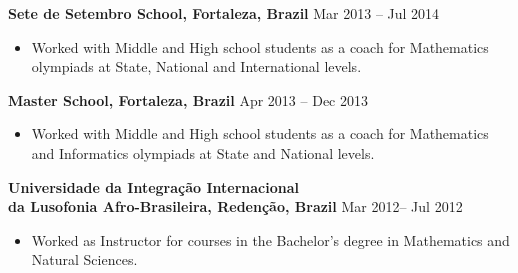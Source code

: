 \documentclass[10pt]{article}
\renewcommand{\section}[1]{\pagebreak[3]%
    \hyphenpenalty=10000%
    \vspace{1.3\baselineskip}%
    \phantomsection\addcontentsline{toc}{section}{#1}%
    \noindent\llap{\scshape\smash{\parbox[t]{\marginparwidth}{\raggedright #1}}}%
    \vspace{-\baselineskip}\par}
\newenvironment{innerlist}[1][\enskip\textbullet]%
        {\begin{itemize}[#1,leftmargin=*,parsep=0pt,itemsep=0pt,topsep=0pt,partopsep=0pt]}
        {\end{itemize}}
\begin{document}
\vspace{1cm}
\textbf{Sete de Setembro School, Fortaleza, Brazil} \hfill {Mar 2013 -- Jul 2014}
\begin{innerlist}
\item[] Worked with Middle and High school students as a coach for Mathematics olympiads at State, National and International levels. 
\end{innerlist}

\vspace{1cm}

\textbf{Master School, Fortaleza, Brazil} \hfill{ Apr 2013 -- Dec 2013}
\begin{innerlist}
\item[] Worked with Middle and High school students as a coach for Mathematics and Informatics olympiads at State and National levels. 
\end{innerlist}

\vspace{1cm}

\textbf{Universidade da Integra\c{c}\~{a}o Internacional \\
da Lusofonia Afro-Brasileira,  Reden\c c\~ao, Brazil } \hfill{Mar 2012-- Jul 2012}
\begin{innerlist}
\item[] Worked as Instructor for courses in the Bachelor's degree in Mathematics and Natural Sciences.  
\end{innerlist}

%
%
%
%
\end{document}
